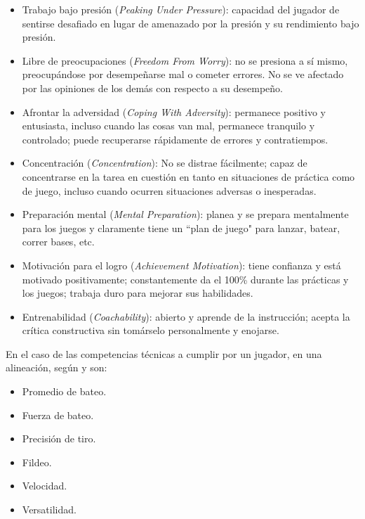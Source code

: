 \begin{itemize}
	\item Trabajo bajo presión (\textit{Peaking Under Pressure}): capacidad del jugador de sentirse desafiado en lugar de amenazado por la presión y su rendimiento bajo presión.
	
	\item Libre de preocupaciones (\textit{Freedom From Worry}): no se presiona a sí mismo, preocupándose por desempeñarse mal o cometer errores. No se ve afectado por las opiniones de los demás con respecto a su desempeño.
	
	\item Afrontar la adversidad (\textit{Coping With Adversity}): permanece positivo y entusiasta, incluso cuando las cosas van mal, permanece tranquilo y controlado; puede recuperarse rápidamente de errores y contratiempos.
	
	\item Concentración (\textit{Concentration}): No se distrae fácilmente; capaz de concentrarse en la tarea en cuestión en tanto en situaciones de práctica como de juego, incluso cuando ocurren situaciones adversas o inesperadas.
	
	\item Preparación mental (\textit{Mental Preparation}): planea y se prepara mentalmente para los juegos y claramente tiene un “plan de juego" para lanzar, batear, correr bases, etc.
	
	\item Motivación para el logro (\textit{Achievement Motivation}): tiene confianza y está motivado positivamente; constantemente da el 100\% durante las prácticas y los juegos; trabaja duro para mejorar sus habilidades.
	
	\item Entrenabilidad (\textit{Coachability}): abierto y aprende de la instrucción; acepta la crítica constructiva sin tomárselo personalmente y enojarse.
\end{itemize}

En el caso de las competencias técnicas a cumplir por un jugador, en una alineación, según \cite{2020a} y \cite{Silverman2011} son:
\begin{itemize}
	\item Promedio de bateo.
	\item Fuerza de bateo.
	\item Precisión de tiro. 
	\item Fildeo.
	\item Velocidad.
	\item Versatilidad.
\end{itemize}

